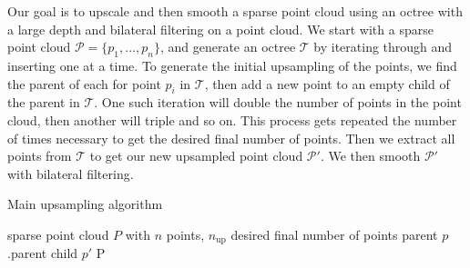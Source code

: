 Our goal is to upscale and then smooth a sparse point cloud using an octree with a large depth and bilateral filtering on a point cloud.
We start with a sparse point cloud $\mathcal{P} = \{p_1, \dots, p_n\}$, and generate an octree $\mathcal{T}$ by iterating through and inserting one at a time.
To generate the initial upsampling of the points, we find the parent of each for point $p_i$ in $\mathcal{T}$, 
then add a new point to an empty child of the parent in $\mathcal{T}$. 
One such iteration will double the number of points in the point cloud, then another will triple and so on. 
This process gets repeated the number of times necessary to get the desired final number of points.
Then we extract all points from $\mathcal{T}$ to get our new upsampled point cloud $\mathcal{P}'$.
We then smooth $\mathcal{P}'$ with bilateral filtering.

\begin{algorithm}[H]
	\caption{Main upsampling algorithm}
	\begin{algorithmic}
		\Require sparse point cloud ${P}$ with $n$ points, $n_{\text{up}}$ desired final number of points
		 \gets {}
				\State parent \gets $p$.parent 
				\State child \gets {}
				\State $p'$ \gets {}
				\State {}
			\EndFor
		\EndFor
		\State P \gets {}
		\State {}
		\EndFunction
	\end{algorithmic}
\end{algorithm}

